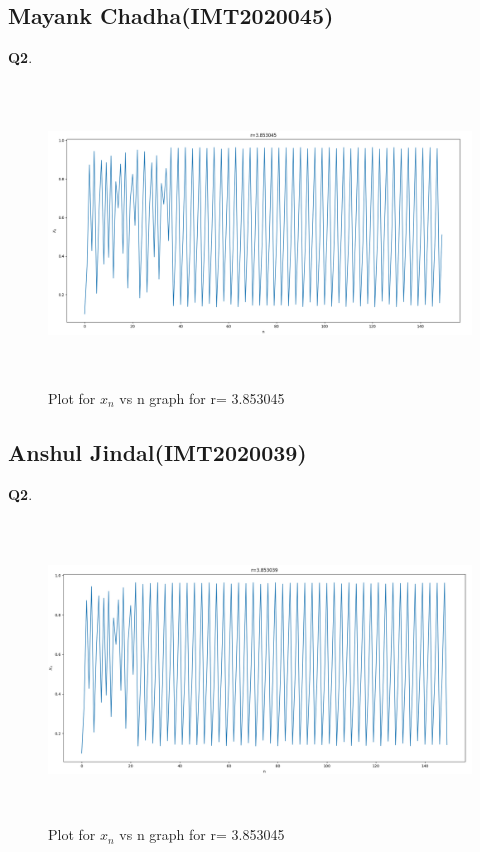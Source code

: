 \documentclass[11pt]{scrartcl} %
\begin{document}
\subsection{Mayank Chadha(IMT2020045)}
\textbf{Q2}.
\begin{figure}[h] %
	\centering
	\includegraphics[width=12cm, height=8cm]{Mayank.png} %
	\caption {Plot for $x_n$ vs n graph for r= 3.853045}
\end{figure}
\subsection{Anshul Jindal(IMT2020039)}
\textbf{Q2}.
\begin{figure}[h] %
	\centering
	\includegraphics[width=12cm, height=8cm]{anshul_bsdk.png} %
	\caption {Plot for $x_n$ vs n graph for r= 3.853045}
\end{figure}
\newpage
\end{document}

